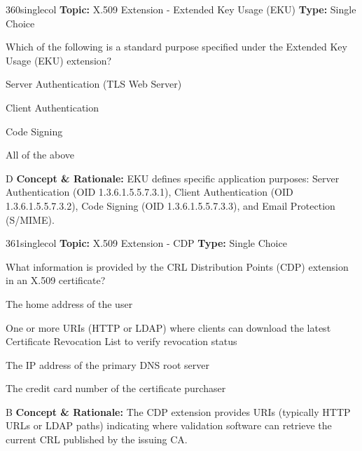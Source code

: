 \begin{qcard}{360}{singlecol}
\textcolor{darkslate!75}{\small\textbf{Topic:} X.509 Extension - Extended Key Usage (EKU) \hfill \textbf{Type:} Single Choice}\vspace{0.4em}\par
Which of the following is a standard purpose specified under the Extended Key Usage (EKU) extension?
\begin{qoptions}
\item Server Authentication (TLS Web Server)
\item Client Authentication
\item Code Signing
\item All of the above
\end{qoptions}
\end{qcard}
\nopagebreak
\begin{explainbox}{D}
\textbf{Concept \& Rationale:} EKU defines specific application purposes: Server Authentication (OID 1.3.6.1.5.5.7.3.1), Client Authentication (OID 1.3.6.1.5.5.7.3.2), Code Signing (OID 1.3.6.1.5.5.7.3.3), and Email Protection (S/MIME).
\end{explainbox}

\begin{qcard}{361}{singlecol}
\textcolor{darkslate!75}{\small\textbf{Topic:} X.509 Extension - CDP \hfill \textbf{Type:} Single Choice}\vspace{0.4em}\par
What information is provided by the CRL Distribution Points (CDP) extension in an X.509 certificate?
\begin{qoptions}
\item The home address of the user
\item One or more URIs (HTTP or LDAP) where clients can download the latest Certificate Revocation List to verify revocation status
\item The IP address of the primary DNS root server
\item The credit card number of the certificate purchaser
\end{qoptions}
\end{qcard}
\nopagebreak
\begin{explainbox}{B}
\textbf{Concept \& Rationale:} The CDP extension provides URIs (typically HTTP URLs or LDAP paths) indicating where validation software can retrieve the current CRL published by the issuing CA.
\end{explainbox}

